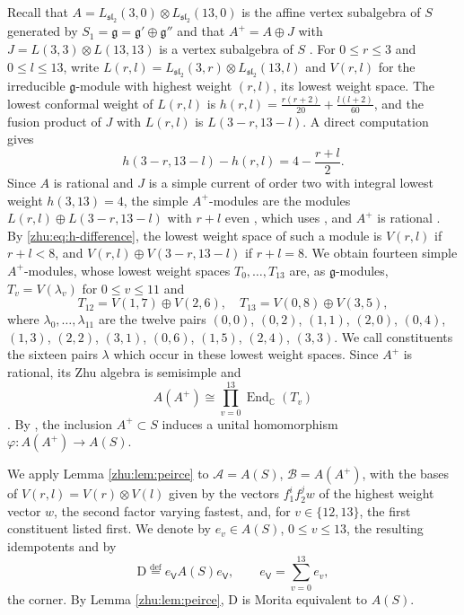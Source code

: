 \documentclass[leqno]{article}
\newcommand{\Cbb}{\ensuremath{\mathbb{C}}}
\newcommand{\D}{\mathrm{D}}
\renewcommand{\leq}{\ensuremath{\leqslant}}
\newcommand{\co}{\colon}
\newcommand{\ot}{\otimes}
\newcommand{\ov}{\overset}
\numberwithin{equation}{section}
\begin{document}
Recall that $A = L_{\mathfrak{sl}_2}(3,0) \ot L_{\mathfrak{sl}_2}(13,0)$ is the affine vertex subalgebra of $S$ generated by $S_1 = \mathfrak g = \mathfrak g' \oplus \mathfrak g''$ and that $A^+ = A \oplus J$ with $J = L(3,3) \ot L(13,13)$ is a vertex subalgebra of $S$ \cite[Proposition 11.4]{Arh26}. For $0 \leq r \leq 3$ and $0 \leq l \leq 13$, write $L(r,l) = L_{\mathfrak{sl}_2}(3,r) \ot L_{\mathfrak{sl}_2}(13,l)$ and $V(r,l)$ for the irreducible $\mathfrak g$-module with highest weight $(r,l)$, its lowest weight space. The lowest conformal weight of $L(r,l)$ is $h(r,l) = \frac{r(r+2)}{20} + \frac{l(l+2)}{60}$, and the fusion product of $J$ with $L(r,l)$ is $L(3-r,13-l)$. A direct computation gives
\begin{equation}
\label{zhu:eq:h-difference}
h(3-r,13-l) - h(r,l) = 4 - \frac{r+l}{2}.
\end{equation}
Since $A$ is rational and $J$ is a simple current of order two with integral lowest weight $h(3,13) = 4$, the simple $A^+$-modules are the modules $L(r,l) \oplus L(3-r,13-l)$ with $r+l$ even \cite[proof of Proposition 11.4]{Arh26}, which uses \cite[Theorem 3.4 p.~16]{HKL15}, and $A^+$ is rational \cite[p.~58]{Arh26}. By \eqref{zhu:eq:h-difference}, the lowest weight space of such a module is $V(r,l)$ if $r + l < 8$, and $V(r,l) \oplus V(3-r,13-l)$ if $r + l = 8$. We obtain fourteen simple $A^+$-modules, whose lowest weight spaces $T_0, \ldots, T_{13}$ are, as $\mathfrak g$-modules, $T_v = V(\lambda_v)$ for $0 \leq v \leq 11$ and
\[
T_{12} = V(1,7) \oplus V(2,6), \quad T_{13} = V(0,8) \oplus V(3,5),
\]
where $\lambda_0, \ldots, \lambda_{11}$ are the twelve pairs $(0,0)$, $(0,2)$, $(1,1)$, $(2,0)$, $(0,4)$, $(1,3)$, $(2,2)$, $(3,1)$, $(0,6)$, $(1,5)$, $(2,4)$, $(3,3)$. We call constituents the sixteen pairs $\lambda$ which occur in these lowest weight spaces. Since $A^+$ is rational, its Zhu algebra is semisimple and
\[
A(A^+) \cong \prod_{v=0}^{13} \operatorname{End}_\Cbb(T_v)
\]
\cite[Theorems 2.2.2 and 2.2.3 p.~261]{Zhu96}. By \cite[Proposition 11.4]{Arh26}, the inclusion $A^+ \subset S$ induces a unital homomorphism $\varphi \co A(A^+) \to A(S)$.

We apply Lemma \ref{zhu:lem:peirce} to $\mathcal A = A(S)$, $\mathcal B = A(A^+)$, with the bases of $V(r,l) = V(r) \ot V(l)$ given by the vectors $f_1^i f_2^j w$ of the highest weight vector $w$, the second factor varying fastest, and, for $v \in \{12, 13\}$, the first constituent listed first. We denote by $e_v \in A(S)$, $0 \leq v \leq 13$, the resulting idempotents and by
\[
\D \ov{\mathrm{def}}{=} e_{\mathsf V} A(S) e_{\mathsf V}, \qquad e_{\mathsf V} = \sum_{v=0}^{13} e_v,
\]
the corner. By Lemma \ref{zhu:lem:peirce}, $\D$ is Morita equivalent to $A(S)$.
\end{document}
